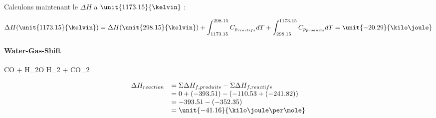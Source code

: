 \documentclass{article}
\begin{document}
Calculons maintenant le $\Delta H$ a $\unit{1173.15}{\kelvin}$ :

$$\Delta H(\unit{1173.15}{\kelvin}) = \Delta H(\unit{298.15}{\kelvin}) 
+ \int_{1173.15}^{298.15} C_{p_{reactifs}} dT + \int_{298.15}^{1173.15} 
C_{p_{produits}} dT = \unit{-20.29}{\kilo\joule}$$

		
\paragraph{Water-Gas-Shift}

\begin{chemmath}
		CO + H_2O \Longrightarrow H_2 + CO_2
\end{chemmath}	

$$
	\begin{array}{rl}
	\Delta H_{reaction}		&= \Sigma \Delta H_{f,produits} - \Sigma \Delta H_{f,reactifs} \\
												&= 0 + (-393.51) - (-110.53 + (-241.82)) \\
												&= -393.51 - (-352.35) \\
												&= \unit{-41.16}{\kilo\joule\per\mole}
	\end{array}
$$
\end{document}
